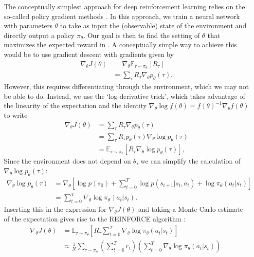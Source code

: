 The conceptually simplest approach for deep reinforcement learning relies on the so-called policy gradient methods \citep{sutton2018reinforcement}.
In this approach, we train a neural network with parameters $\theta$ to take as input the (observable) state of the environment and directly output a policy $\pi_\theta$.
Our goal is then to find the setting of $\theta$ that maximizes the expected reward in .
A conceptually simple way to achieve this would be to use gradient descent with gradients given by
\begin{align}
    \nabla_\theta J(\theta) &= \nabla_\theta \mathbb{E}_{\tau \sim \pi_\theta} \left [ R_\tau \right ]\\
    &= \sum_{\tau} R_\tau \nabla_\theta p_\theta(\tau).
\end{align}
However, this requires differentiating through the environment, which we may not be able to do.
Instead, we use the `log-derivative trick', which takes advantage of the linearity of the expectation and the identity $\nabla_\theta \log f(\theta) = f(\theta)^{-1} \nabla_\theta f(\theta)$ to write
\begin{align}
    \nabla_\theta J(\theta) & = \sum_\tau R_\tau \nabla_\theta p_\theta(\tau) \\
                            & = \sum_\tau R_\tau p_\theta(\tau) \nabla_\theta \log p_\theta(\tau) \\
                            & = \mathbb{E}_{\tau \sim \pi_\theta} \left [ R_\tau \nabla_\theta \log p_\theta(\tau) \right ],
\end{align}
Since the environment does not depend on $\theta$, we can simplify the calculation of $\nabla_\theta \log p_\theta (\tau)$:
\begin{align}
    \nabla_\theta \log p_\theta(\tau) & = \nabla_\theta \left [ \log p(s_0) + \sum_{t=0}^T \log p(s_{t+1} | s_t, a_t) + \log \pi_\theta (a_t|s_t) \right ] \\
                                      & = \sum_{t=0}^T \nabla_\theta \log \pi_\theta (a_t|s_t).
\end{align}
Inserting this in the expression for $\nabla_\theta J(\theta)$ and taking a Monte Carlo estimate of the expectation gives rise to the REINFORCE algorithm \citep{williams1992simple}:
\begin{align}
    \nabla_\theta J(\theta) & = \mathbb{E}_{\tau \sim \pi_\theta} \left [ R_\tau \sum_{t=0}^T \nabla_\theta \log \pi_\theta (a_t|s_t) \right ]                                         \\
                            & \approx \frac{1}{N} \sum_{\tau \sim \pi_\theta} \left ( \sum_{t=0}^T r_t \right ) \left ( \sum_{t=0}^T \nabla_\theta \log \pi_\theta (a_t|s_t) \right ).
\end{align}

